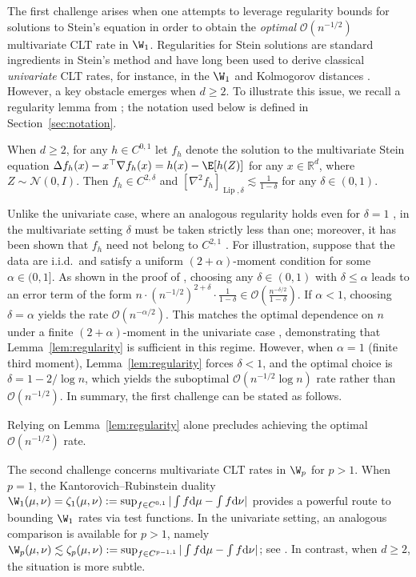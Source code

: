 \documentclass[mnsc,nonblindrev]{informs3}
\begin{document}
The first challenge arises when one attempts to leverage regularity bounds for
solutions to Stein's equation in order to obtain the \emph{optimal}
$\mathcal{O}(n^{-1/2})$ multivariate CLT rate in $\W_1$. Regularities for
Stein solutions are standard ingredients in Stein's method and have long been
used to derive classical \emph{univariate} CLT rates, for instance, in the
$\W_1$ and Kolmogorov distances \citep{chen2010normal,nourdin2012normal}.
However, a key obstacle emerges when $d\ge 2$. To illustrate this issue, we
recall a regularity lemma from \cite{gallouet2018regularity}; the
notation used below is defined in Section~\ref{sec:notation}.
\begin{lemma}\label{lem:regularity} When $d\ge 2$, for any $h\in C^{0,1}$ let $f_h$ denote the solution to the multivariate Stein equation $\Delta f_h(x) - x^{\top}\nabla f_h(x)=h(x)-\E[h(Z)]$ for any $x\in\mathbb{R}^d$, where $Z\sim\mathcal N(0,I)$. Then $f_h\in C^{2,\delta}$ and $[\nabla^2 f_h]_{\operatorname{Lip},\delta} \lesssim \frac{1}{1-\delta}$ for any $\delta\in(0,1)$. \end{lemma}
Unlike the univariate case, where an analogous regularity holds even for
$\delta=1$ \citep[Lemma~6]{barbour1986asymptotic}, in the multivariate setting
 $\delta$ must be taken strictly less than one; moreover, it has been shown that
$f_h$ need not belong to $C^{2,1}$ \citep{raivc2004multivariate}.
 For illustration, suppose that the data are i.i.d.\ and satisfy a uniform
$(2+\alpha)$-moment condition for some $\alpha\in(0,1]$.
 As shown in the proof of
\cite[Theorem~1.1]{gallouet2018regularity}, choosing any $\delta\in(0,1)$ with
$\delta\le \alpha$ leads to an error term of the form $n \cdot (n^{-1/2})^{2+\delta} \cdot \frac{1}{1-\delta} \in \mathcal{O}(\frac{n^{-\delta/2}}{1-\delta} )$.  If $\alpha<1$, choosing $\delta=\alpha$ yields the rate $\mathcal O(n^{-\alpha/2})$.
This matches the optimal dependence on $n$ under a finite
$(2+\alpha)$-moment in the univariate case \citep{ibragimov1966accuracy}, demonstrating that Lemma~\ref{lem:regularity} is sufficient in this regime.
However, when $\alpha=1$ (finite third moment),
Lemma~\ref{lem:regularity} forces $\delta<1$, and the optimal choice is
$\delta=1-2/\log n$, which yields the suboptimal
$\mathcal O(n^{-1/2}\log n)$ rate rather than $\mathcal O(n^{-1/2})$. In summary, the first challenge can be stated as follows.
\begin{challenge}\label{challenge:regularity} Relying on Lemma~\ref{lem:regularity} alone precludes achieving the optimal
$\mathcal{O}(n^{-1/2})$ rate. 


\end{challenge}
The second challenge concerns multivariate CLT rates in $\W_p$ for $p>1$.
When $p=1$, the Kantorovich--Rubinstein duality $\W_1(\mu,\nu) = \zeta_1(\mu,\nu):= \sup_{f\in C^{0,1}}|\int f\mathrm d\mu-\int f\mathrm d\nu|$ provides a powerful route to bounding $\W_1$ rates via test functions.
In the univariate setting, an analogous comparison is available for $p>1$, namely $\W_p(\mu,\nu) \lesssim \zeta_p(\mu,\nu):=\sup_{f\in C^{p-1,1}}|\int f\mathrm d\mu-\int f\mathrm d\nu|$; see \cite{liu2023wasserstein}. In contrast, when $d\ge 2$, the situation is more subtle.
\end{document}
